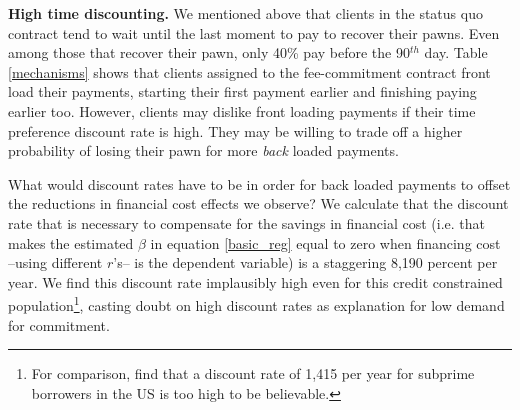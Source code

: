 \documentclass[oneside,11pt]{article}
\begin{document}
\vspace{.1in}
\noindent \textbf{High time discounting.} We mentioned above that clients in the status quo contract tend to wait until the last moment to pay to recover their pawns. Even among those that recover their pawn, only 40\% pay before the 90$^{th}$ day. Table \ref{mechanisms} shows that clients assigned to the fee-commitment contract front load their payments, starting their first payment earlier and finishing paying earlier too. However, clients may dislike front loading payments if their time preference discount rate is high. They may be willing to trade off a higher probability of losing their pawn for more \textit{back} loaded payments.  

What would discount rates have to be in order for back loaded payments to offset the reductions in financial cost effects we observe? %
We calculate that the discount rate that is necessary to compensate for the savings in financial cost (i.e. that makes the estimated $\beta$ in equation \ref{basic_reg} equal to zero when financing cost --using different $r$'s-- is the dependent variable) is a staggering 8,190 percent per year. We find this discount rate implausibly high even for this credit constrained population\footnote{For comparison, \cite{Levin} find that a discount rate of 1,415 per year for subprime borrowers in the US is too high to be believable.}, casting doubt on high discount rates as explanation for low demand for commitment. %

\end{document}

